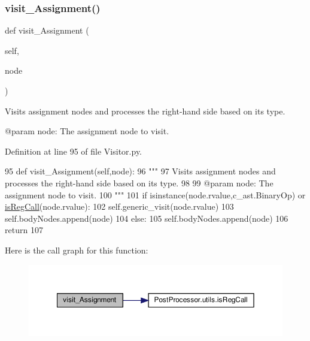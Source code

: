 \subsubsection{\texorpdfstring{visit\+\_\+\+Assignment()}{visit\_Assignment()}}
{\footnotesize\ttfamily def visit\+\_\+\+Assignment (\begin{DoxyParamCaption}\item[{}]{self,  }\item[{}]{node }\end{DoxyParamCaption})}

\begin{DoxyVerb}Visits assignment nodes and processes the right-hand side based on its type.

@param node: The assignment node to visit.
\end{DoxyVerb}
 

Definition at line 95 of file Visitor.\+py.


\begin{DoxyCode}
95     \textcolor{keyword}{def }visit\_Assignment(self,node):
96         \textcolor{stringliteral}{"""
}
97 \textcolor{stringliteral}{        Visits assignment nodes and processes the right-hand side based on its type.
}
98 \textcolor{stringliteral}{
}
99 \textcolor{stringliteral}{        @param node: The assignment node to visit.
}
100 \textcolor{stringliteral}{        """}
101         \textcolor{keywordflow}{if} isinstance(node.rvalue,c\_ast.BinaryOp) \textcolor{keywordflow}{or} \hyperlink{namespacePostProcessor_1_1utils_a89d6f2461251261de6b862c69fe3c44a}{isRegCall}(node.rvalue):
102             self.generic\_visit(node.rvalue)
103             self.bodyNodes.append(node)
104         \textcolor{keywordflow}{else}:
105             self.bodyNodes.append(node)
106             \textcolor{keywordflow}{return}
107 
\end{DoxyCode}
Here is the call graph for this function\+:\nopagebreak
\begin{figure}[H]
\begin{center}
\leavevmode
\includegraphics[width=350pt]{classPostProcessor_1_1Visitor_1_1NegationVisitor_adae6ad6f5b94c4acd95924bb3df9ebc8_cgraph}
\end{center}
\end{figure}
\mbox{\label{classPostProcessor_1_1Visitor_1_1NegationVisitor_a6568bead87923bbcaa593e5f226920f0}} 
